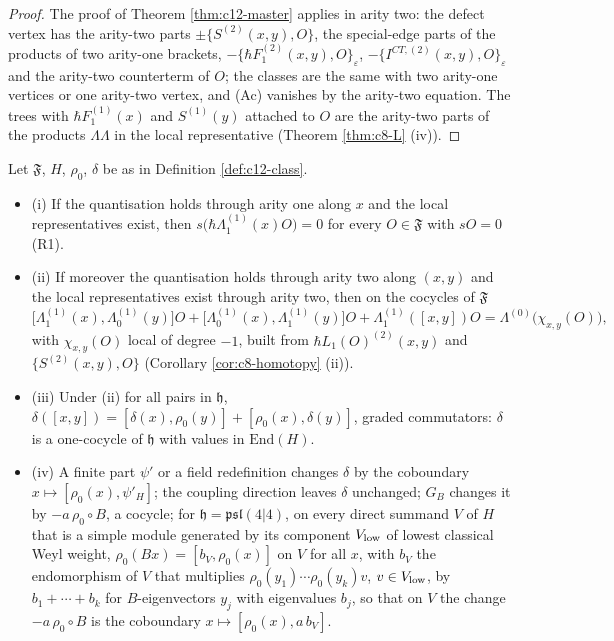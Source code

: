\begin{proof}
The proof of Theorem \ref{thm:c12-master} applies in arity two: the defect vertex has the arity-two parts $\pm\{S^{(2)}(x,y),O\}$, the special-edge parts of the products of two arity-one brackets, $-\{\hbar F_1^{(2)}(x,y),O\}_\varepsilon$, $-\{I^{CT,(2)}(x,y),O\}_\varepsilon$ and the arity-two counterterm of $O$; the classes are the same with two arity-one vertices or one arity-two vertex, and (Ac) vanishes by the arity-two equation. The trees with $\hbar F_1^{(1)}(x)$ and $S^{(1)}(y)$ attached to $O$ are the arity-two parts of the products $\Lambda\Lambda$ in the local representative (Theorem \ref{thm:c8-L} (iv)).
\end{proof}

\begin{theorem}
\label{thm:c12-opalg}
Let $\mathfrak F$, $H$, $\rho_0$, $\delta$ be as in Definition \ref{def:c12-class}.
\begin{itemize}
\item (i) If the quantisation holds through arity one along $x$ and the local representatives exist, then $s\big(\hbar\Lambda^{(1)}_1(x)O\big)=0$ for every $O\in\mathfrak F$ with $sO=0$ (R1).
\item (ii) If moreover the quantisation holds through arity two along $(x,y)$ and the local representatives exist through arity two, then on the cocycles of $\mathfrak F$
\begin{equation}
\big[\Lambda^{(1)}_1(x),\Lambda^{(1)}_0(y)\big]O+\big[\Lambda^{(1)}_0(x),\Lambda^{(1)}_1(y)\big]O+\Lambda^{(1)}_1([x,y])O=\Lambda^{(0)}\big(\chi_{x,y}(O)\big),
\label{eq:c12-Rxy}
\end{equation}
with $\chi_{x,y}(O)$ local of degree $-1$, built from $\hbar L_1(O)^{(2)}(x,y)$ and $\{S^{(2)}(x,y),O\}$ (Corollary \ref{cor:c8-homotopy} (ii)).
\item (iii) Under (ii) for all pairs in $\mathfrak h$, $\delta([x,y])=[\delta(x),\rho_0(y)]+[\rho_0(x),\delta(y)]$, graded commutators: $\delta$ is a one-cocycle of $\mathfrak h$ with values in $\mathrm{End}(H)$.
\item (iv) A finite part $\psi'$ or a field redefinition changes $\delta$ by the coboundary $x\mapsto[\rho_0(x),\psi'_H]$; the coupling direction leaves $\delta$ unchanged; $G_B$ changes it by $-a\,\rho_0\circ B$, a cocycle; for $\mathfrak h=\mathfrak{psl}(4|4)$, on every direct summand $V$ of $H$ that is a simple module generated by its component $V_{\rm low}$ of lowest classical Weyl weight, $\rho_0(Bx)=[b_V,\rho_0(x)]$ on $V$ for all $x$, with $b_V$ the endomorphism of $V$ that multiplies $\rho_0(y_1)\cdots\rho_0(y_k)v$, $v\in V_{\rm low}$, by $b_1+\cdots+b_k$ for $B$-eigenvectors $y_j$ with eigenvalues $b_j$, so that on $V$ the change $-a\,\rho_0\circ B$ is the coboundary $x\mapsto[\rho_0(x),a\,b_V]$.
\end{itemize}
\end{theorem}

